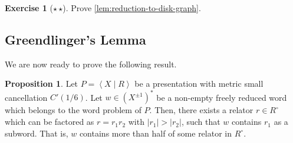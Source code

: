 \documentclass[11pt,a4paper,reqno]{amsart}
\theoremstyle{plain}
\theoremstyle{definition}
\newtheorem{proposition}[theorem]{Proposition}
\theoremstyle{definition}
\newtheorem{exercise}[theorem]{Exercise}
\newcommand\exerciseLevelMedium{$\star${\,}$\star$}
\begin{document}
\begin{exercise}[\exerciseLevelMedium]
	Prove \cref{lem:reduction-to-disk-graph}.
\end{exercise}

\subsection{Greendlinger's Lemma}
We are now ready to prove the following result.

\begin{proposition}\label{prop:small-cancellation-theorem}
	Let $P = \left\langle X \mid R \right\rangle$ be a presentation with metric small cancellation $C'(1/6)$.
	Let $w \in (X^{\pm 1})^*$ be a non-empty freely reduced word which belongs to the word problem of $P$.
	Then, there exists a relator $r \in R^\circ$ which can be factored as $r = r_1 r_2$ with $|r_1| > |r_2|$, such that $w$ contains $r_1$ as a subword.
	That is, $w$ contains more than half of some relator in $R^\circ$.
\end{proposition}
\end{document}
